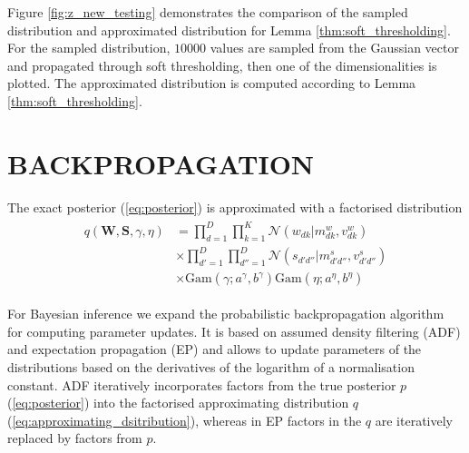 \documentclass[letterpaper]{article}
\begin{document}
Figure \ref{fig:z_new_testing} demonstrates the comparison of the sampled distribution and approximated distribution for Lemma \ref{thm:soft_thresholding}. For the sampled distribution, $10000$ values are sampled from the Gaussian vector and propagated through soft thresholding, then one of the dimensionalities is plotted. The approximated distribution is computed according to Lemma \ref{thm:soft_thresholding}.


%


\section{\uppercase{Backpropagation}}
\label{sec:backpropagation}

The exact posterior (\ref{eq:posterior}) is approximated with a factorised distribution
\begin{align}
\label{eq:approximating_dsitribution}
\begin{split}
q(\mathbf{W}, \mathbf{S}, \gamma, \eta) &= \prod_{d=1}^D\prod_{k=1}^K \mathcal{N}(w_{dk} | m^w_{dk}, v^w_{dk}) \\
&\times \prod_{d'=1}^D\prod_{d''=1}^D \mathcal{N}(s_{d'd''} | m^s_{d'd''}, v^s_{d'd''}) \\
&\times \text{Gam}(\gamma; a^\gamma, b^\gamma) \text{Gam}(\eta; a^\eta, b^\eta)
\end{split}
\end{align}

For Bayesian inference we expand the probabilistic backpropagation algorithm~\citep{hernandez2015probabilistic} for computing parameter updates. It is based on assumed density filtering (ADF) and expectation propagation (EP) and allows to update parameters of the distributions based on the derivatives of the logarithm of a normalisation constant. ADF iteratively incorporates factors from the true posterior $p$ (\ref{eq:posterior}) into the factorised approximating distribution $q$ (\ref{eq:approximating_dsitribution}), whereas in EP factors in the $q$ are iteratively replaced by factors from $p$.
\end{document}
